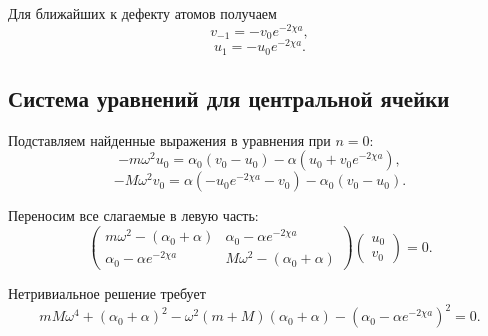 \documentclass[../final.tex]{subfiles}
\begin{document}
Для ближайших к дефекту атомов получаем
%
\begin{equation*}
    v_{-1}
    =
    -v_0e^{-2\chi a},
\end{equation*}
%
\begin{equation*}
    u_1
    =
    -u_0e^{-2\chi a}.
\end{equation*}



\subsection*{Система уравнений для центральной ячейки}

Подставляем найденные выражения в уравнения при $n=0$:
%
\begin{equation*}
    -m\omega^2u_0
    =
    \alpha_0(v_0-u_0)
    -
    \alpha
    \left(
        u_0+v_0e^{-2\chi a}
    \right),
\end{equation*}
%
\begin{equation*}
    -M\omega^2v_0
    =
    \alpha
    \left(
        -u_0e^{-2\chi a}-v_0
    \right)
    -
    \alpha_0(v_0-u_0).
\end{equation*}
%

Переносим все слагаемые в левую часть:
%
\begin{equation*}
    \begin{pmatrix}
        m\omega^2-(\alpha_0+\alpha)
        &
        \alpha_0-\alpha e^{-2\chi a}
        \\[2mm]
        \alpha_0-\alpha e^{-2\chi a}
        &
        M\omega^2-(\alpha_0+\alpha)
    \end{pmatrix}
    \begin{pmatrix}
        u_0
        \\
        v_0
    \end{pmatrix}
    =
    0.
\end{equation*}
%

Нетривиальное решение требует
%
\begin{equation*}
    mM\omega^4
    +
    (\alpha_0+\alpha)^2
    -
    \omega^2(m+M)(\alpha_0+\alpha)
    -
    \left(
        \alpha_0-\alpha e^{-2\chi a}
    \right)^2
    =
    0.
\end{equation*}


\end{document}
